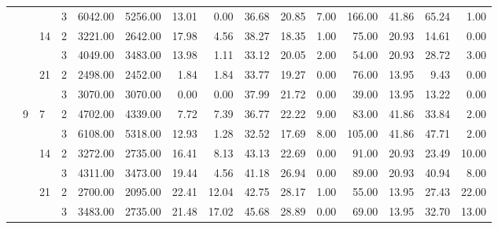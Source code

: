 \begin{tabular}{llllrrrrrrrrrrr}
              &   &    & 3 &  6042.00 &   5256.00 & 13.01 &    0.00 &   36.68 &   20.85 &    7.00 &  166.00 &   41.86 & 65.24 &     1.00 \\
\cline{3-15}
              &   & \multirow{2}{*}{14} & 2 &  3221.00 &   2642.00 & 17.98 &    4.56 &   38.27 &   18.35 &    1.00 &   75.00 &   20.93 & 14.61 &     0.00 \\
              &   &    & 3 &  4049.00 &   3483.00 & 13.98 &    1.11 &   33.12 &   20.05 &    2.00 &   54.00 &   20.93 & 28.72 &     3.00 \\
\cline{3-15}
              &   & \multirow{2}{*}{21} & 2 &  2498.00 &   2452.00 &  1.84 &    1.84 &   33.77 &   19.27 &    0.00 &   76.00 &   13.95 &  9.43 &     0.00 \\
              &   &    & 3 &  3070.00 &   3070.00 &  0.00 &    0.00 &   37.99 &   21.72 &    0.00 &   39.00 &   13.95 & 13.22 &     0.00 \\
\cline{2-15}
\cline{3-15}
              & \multirow{6}{*}{9} & \multirow{2}{*}{7} & 2 &  4702.00 &   4339.00 &  7.72 &    7.39 &   36.77 &   22.22 &    9.00 &   83.00 &   41.86 & 33.84 &     2.00 \\
              &   &    & 3 &  6108.00 &   5318.00 & 12.93 &    1.28 &   32.52 &   17.69 &    8.00 &  105.00 &   41.86 & 47.71 &     2.00 \\
\cline{3-15}
              &   & \multirow{2}{*}{14} & 2 &  3272.00 &   2735.00 & 16.41 &    8.13 &   43.13 &   22.69 &    0.00 &   91.00 &   20.93 & 23.49 &    10.00 \\
              &   &    & 3 &  4311.00 &   3473.00 & 19.44 &    4.56 &   41.18 &   26.94 &    0.00 &   89.00 &   20.93 & 40.94 &     8.00 \\
\cline{3-15}
              &   & \multirow{2}{*}{21} & 2 &  2700.00 &   2095.00 & 22.41 &   12.04 &   42.75 &   28.17 &    1.00 &   55.00 &   13.95 & 27.43 &    22.00 \\
              &   &    & 3 &  3483.00 &   2735.00 & 21.48 &   17.02 &   45.68 &   28.89 &    0.00 &   69.00 &   13.95 & 32.70 &    13.00 \\
\bottomrule
\end{tabular}
